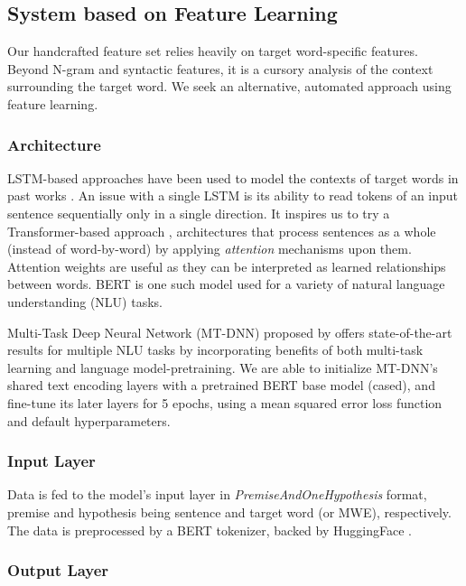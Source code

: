 \documentclass[11pt,a4paper]{article}
\begin{document}
\subsection{System based on Feature Learning}

Our handcrafted feature set relies heavily on target word-specific features. Beyond N-gram and syntactic features, it is a cursory analysis of the context surrounding the target word. We seek an alternative, automated approach using feature learning.

\subsubsection{Architecture}

LSTM-based approaches have been used to model the contexts of target words in past works \citep{hartmanndossantos2018nilc, dehertogtack2018deep}. An issue with a single LSTM is its ability to read tokens of an input sentence sequentially only in a single direction. It inspires us to try a Transformer-based approach \citep{DBLP:journals/corr/VaswaniSPUJGKP17}, architectures that process sentences as a whole (instead of word-by-word) by applying \textit{attention} mechanisms upon them. Attention weights are useful as they can be interpreted as learned relationships between words. BERT \citep{DBLP:journals/corr/abs-1810-04805} is one such model used for a variety of natural language understanding (NLU) tasks.

Multi-Task Deep Neural Network (MT-DNN) proposed by \citet{liuetal2019multitask} offers state-of-the-art results for multiple NLU tasks by incorporating benefits of both multi-task learning and language model-pretraining. We are able to initialize MT-DNN's shared text encoding layers with a pretrained BERT base model (cased), and fine-tune its later layers for 5 epochs, using a mean squared error loss function and default hyperparameters.

\subsubsection{Input Layer}

Data is fed to the model's input layer in \textit{PremiseAndOneHypothesis} format, premise and hypothesis being sentence and target word (or MWE), respectively. The data is preprocessed by a BERT tokenizer, backed by HuggingFace \citep{wolf_etal_2020_transformers}.

\subsubsection{Output Layer}
\end{document}
